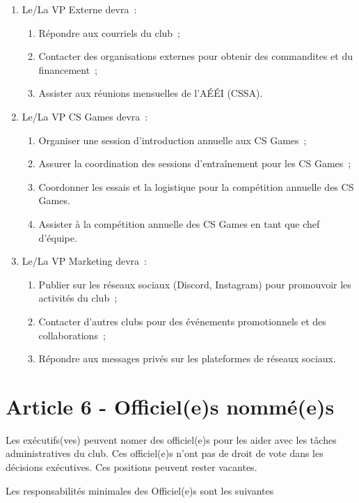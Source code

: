 \begin{enumerate}
    \item Le/La VP Externe devra~:
    \begin{enumerate}
        \item Répondre aux courriels du club~;
        \item Contacter des organisations externes pour obtenir des commandites et du financement~;
        \item Assister aux réunions mensuelles de l'AÉÉI (CSSA).
    \end{enumerate}

    \item Le/La VP CS Games devra~:
    \begin{enumerate}
      \item Organiser une session d'introduction annuelle aux CS Games~;
      \item Assurer la coordination des sessions d'entraînement pour les CS Games~;
      \item Coordonner les essais et la logistique pour la compétition annuelle des CS Games.
      \item Assister à la compétition annuelle des CS Games en tant que chef d'équipe.
    \end{enumerate}

    \item Le/La VP Marketing devra~:
    \begin{enumerate}
        \item Publier sur les réseaux sociaux (Discord, Instagram) pour promouvoir les activités du club~;
        \item Contacter d'autres clubs pour des événements promotionnels et des collaborations~;
        \item Répondre aux messages privés sur les plateformes de réseaux sociaux.
    \end{enumerate}
\end{enumerate}



\section*{Article 6 - Officiel(e)s nommé(e)s}

Les exécutifs(ves) peuvent nomer des officiel(e)s pour les aider avec les
tâches administratives du club. Ces officiel(e)s n'ont pas de droit de vote dans les décisions exécutives.
Ces positions peuvent rester vacantes.

Les responsabilités minimales des Officiel(e)s sont les suivantes

